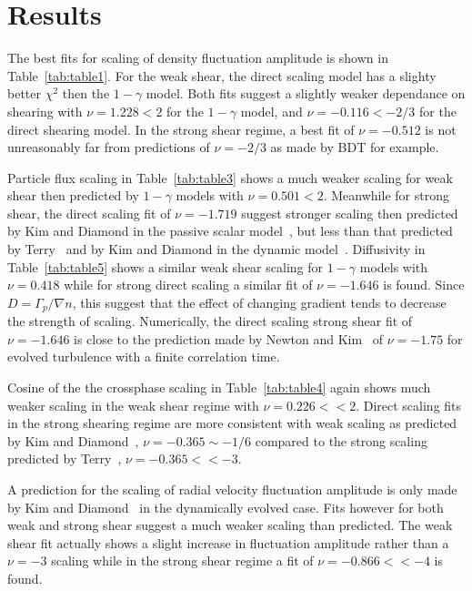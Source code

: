 \documentclass[aip,pop,amsmath,amssymb,reprint,superscriptaddress]{revtex4-1} %
\begin{document}
\section{Results}

The best fits for scaling of density fluctuation amplitude is shown in Table~\ref{tab:table1}. For the weak shear, the direct scaling model has a slighty better $\chi^{2}$ then the $1-\gamma$ model. Both fits suggest a slightly weaker dependance on shearing with $\nu = 1.228 < 2$ for the $1-\gamma$ model, and $\nu = -0.116 < -2/3$ for the direct shearing model. In the strong shear regime, a best fit of $\nu = -0.512$ is not unreasonably far from predictions of $\nu = -2/3$ as made by BDT for example.

Particle flux scaling in Table~\ref{tab:table3} shows a much weaker scaling for weak shear then predicted by $1-\gamma$ models with $\nu = 0.501 < 2$. Meanwhile for strong shear, the direct scaling fit of $\nu = -1.719$ suggest stronger scaling then predicted by Kim and Diamond in the passive scalar model~\cite{kim03}, but less than that predicted by Terry~\cite{terry01} and by Kim and Diamond in the dynamic model~\cite{kim04}. Diffusivity in Table~\ref{tab:table5} shows a similar weak shear scaling for $1-\gamma$ models with $\nu = 0.418$ while for strong direct scaling a similar fit of $\nu = -1.646$ is found. Since $D=\Gamma_p/\nabla n$, this suggest that the effect of changing gradient tends to decrease the strength of scaling. Numerically, the direct scaling strong shear fit of $\nu = -1.646$ is close to the prediction made by Newton and Kim~\cite{newton11} of $\nu = -1.75$ for evolved turbulence with a finite correlation time.

Cosine of the the crossphase scaling in Table~\ref{tab:table4} again shows much weaker scaling in the weak shear regime with $\nu = 0.226 << 2$. Direct scaling fits in the strong shearing regime are more consistent with weak scaling as predicted by Kim and Diamond~\cite{kim03,kim04}, $\nu = -0.365 \sim -1/6$ compared to the strong scaling predicted by Terry~\cite{terry01}, $\nu = -0.365 << -3$.

A prediction for the scaling of radial velocity fluctuation amplitude is only made by Kim and Diamond~\cite{kim04} in the dynamically evolved case. Fits however for both weak and strong shear suggest a much weaker scaling than predicted. The weak shear fit actually shows a slight increase in fluctuation amplitude rather than a $\nu = -3$ scaling while in the strong shear regime a fit of $\nu = -0.866 << -4$ is found.
\end{document}
